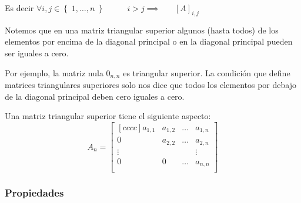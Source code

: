 \documentclass[12pt, fleqn]{report}                             %
\DeclareMathOperator \Space     {\quad}                         %
\DeclareMathOperator \MegaSpace {\quad \quad}                   %
\theoremstyle{break}                                            %
\newcommand{\Set}[1]            {\left\{ \; #1 \; \right\}}     %
\begin{document}
            Es decir $\forall i, j \in \Set{1, \dots, n} \MegaSpace i > j \implies \Space [A]_{i, j}$

            \vspace{1em}

            Notemos que en una matriz triangular superior algunos (hasta todos) de los elementos
            por encima de la diagonal principal o en la diagonal principal pueden ser iguales a cero.

            Por ejemplo, la matriz nula $0_{n,n}$ es triangular superior. La condición que define
            matrices triangulares superiores solo nos dice que todos los elementos por debajo de la
            diagonal principal deben cero iguales a cero.

            Una matriz triangular superior tiene el siguiente aspecto:
            \begin{equation*}
                A_n =
                \begin{bmatrix}[cccc]
                    a_{1,1} & a_{1, 2}  & \dots & a_{1, n}  \\
                    0       & a_{2,2}   & \dots & a_{2, n}  \\
                    \vdots  &           &       & \vdots    \\
                    0       & 0         & \dots & a_{n,n}   \\
                \end{bmatrix}
            \end{equation*}

            \clearpage
            \subsubsection{Propiedades}
\end{document}
